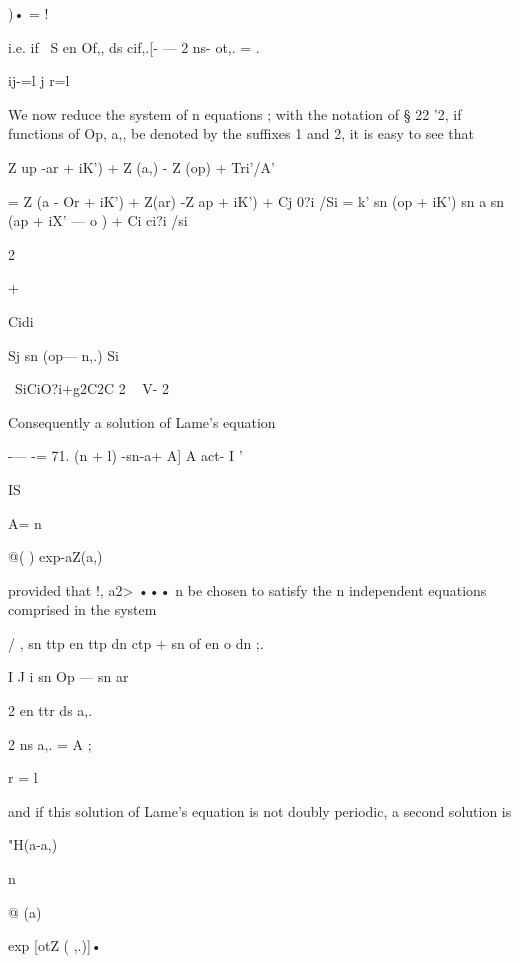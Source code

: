 {{{{{{{{)• = ! 



i.e. if \ S en Of,, ds cif,.[- — 2 ns- ot,. =  . 

ij-=l j r=l 

We now reduce the system of n equations ; with the notation of § 22 '2, if functions of 
Op, a,, be denoted by the suffixes 1 and 2, it is easy to see that 

Z  up -ar + iK') + Z (a,) - Z (op) +   Tri'/A' 

= Z (a  - Or + iK') + Z(ar) -Z ap + iK') + Cj 0?i /Si 
= k'  sn (op + iK') sn a  sn (ap + iX' — o ) + Ci ci?i /si 



 2 



+ 



Cidi 



Sj sn (op— n,.) Si 

\  SiCiO?i+g2C2C 2 
~ V- 2  

Consequently a solution of Lame's equation 

-— -=  71. (n + l) -sn-a+ A] A 
act- I   ' 



IS 



A= n 



@( ) exp-aZ(a,)  



provided that  !, a2> •••  n be chosen to satisfy the n independent equations 
comprised in the system 

/  , sn ttp en ttp dn ctp + sn of  en o  dn  ;. \  

I J i sn  Op — sn  ar 



2 en ttr ds a,. 



2 ns  a,. = A ; 

r = l 



and if this solution of Lame's equation is not doubly periodic, a second 
solution is 

"H(a-a,) 



n 



@ (a) 



exp [otZ ( ,.)]• 



}}}}}}}}
